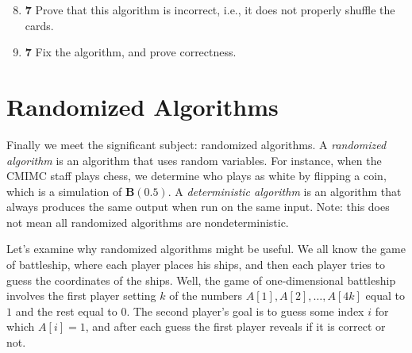 \documentclass[12pt]{article}
\theoremstyle{plain}
\theoremstyle{definition}
\theoremstyle{remark}
\newcommand{\pts}[1]{\lbrack\textbf{#1}\rbrack}
\begin{document}
\begin{enumerate}
\setcounter{enumi}{7}

\item \pts{7} Prove that this algorithm is incorrect, i.e., it does not properly shuffle the cards.

\begin{comment}\begin{tcolorbox}
Suppose the algorithm works.  There are $N^N$ possible outcomes of this algorithm, all equally likely, and there are $N!$ possible permutations, so $N!\mid N^N$.  Then \[N\mid N!\mid N^N,\] but $\gcd(N-1,N^N)=1$.  Thus $N-1\mid 1$, which is a contradiction.
\end{tcolorbox}\end{comment}

\item \pts{7} Fix the algorithm, and prove correctness.

\begin{comment}\begin{tcolorbox}
Instead of choosing $j$ uniformly at random from $\{1,2,\dots,N\}$, choose it uniformly at random from $\{i,i+1,\dots,N\}$. That is, replace the line $j\gets\textbf{D}(N)$ with $j\gets i-1+\textbf{D}(N+1-i)$. This algorithm is correct since there are $N!$ possibilities, and we can get any given permutation $C_{\sigma(1)},C_{\sigma(2)},\dots,C_{\sigma(N)}$ if, at the $i$th iteration, we swap $C_{\sigma(i)}\in\{C_1,C_2,\dots,C_N\}\backslash\{C_{\sigma(1)},C_{\sigma(2)},\dots,C_{\sigma(i-1)}\}$ with the card at position $i$ for all $i=1,2,\dots,N$.
\end{tcolorbox}\end{comment}
\end{enumerate}

\section{Randomized Algorithms}

Finally we meet the significant subject: randomized algorithms. A \emph{randomized algorithm} is an algorithm that uses random variables. For instance, when the CMIMC staff plays chess, we determine who plays as white by flipping a coin, which is a simulation of $\textbf{B}(0.5)$. A \emph{deterministic algorithm} is an algorithm that always produces the same output when run on the same input. Note: this does not mean all randomized algorithms are nondeterministic.

Let's examine why randomized algorithms might be useful. We all know the game of battleship, where each player places his ships, and then each player tries to guess the coordinates of the ships. Well, the game of one-dimensional battleship involves the first player setting $k$ of the numbers $A[1],A[2],\dots,A[4k]$ equal to $1$ and the rest equal to $0$. The second player's goal is to guess some index $i$ for which $A[i]=1$, and after each guess the first player reveals if it is correct or not.
\end{document}
